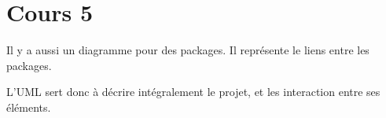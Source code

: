 \section{Cours 5}
Il y a aussi un diagramme pour des packages. Il représente le liens entre les packages.

L'UML sert donc à décrire intégralement le projet, et les interaction entre ses éléments.
